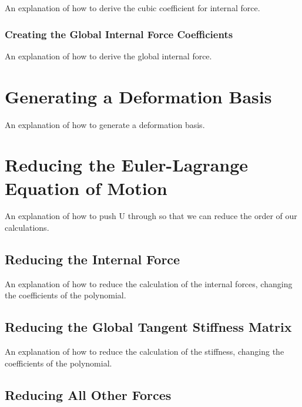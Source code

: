 \documentclass[twocolumn,10pt]{asme2ej}
\begin{document}
An explanation of how to derive the cubic coefficient for internal force.

\subsubsection{Creating the Global Internal Force Coefficients}

An explanation of how to derive the global internal force.

\section{Generating a Deformation Basis}

An explanation of how to generate a deformation basis.

\section{Reducing the Euler-Lagrange Equation of Motion}

An explanation of how to push U through so that we can reduce the order of our calculations.

\subsection{Reducing the Internal Force}

An explanation of how to reduce the calculation of the internal forces, changing the coefficients
of the polynomial.

\subsection{Reducing the Global Tangent Stiffness Matrix}

An explanation of how to reduce the calculation of the stiffness, changing the coefficients
of the polynomial.

\subsection{Reducing All Other Forces}
\end{document}
